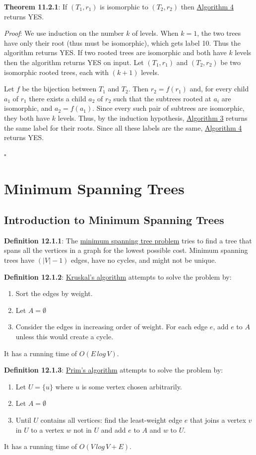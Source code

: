 \documentclass{article}
\newcommand{\separate}[1] {\vspace{#1 pt}\noindent}
\newcommand{\definition}[2]{\textbf{Definition #1}: #2\label{def:#1}}
\newcommand{\proof}[2]{\textit{Proof}: #2 \begin{flushright}\(\square\)\end{flushright}\label{prf:#1}}
\newcommand{\theorem}[3]{\textbf{Theorem #1}: #2 \par\separate{3}\proof{thm:#1}{#3}\label{thm:#1}}
\begin{document}
\noindent\theorem{11.2.1}{If \((T_1,r_1)\) is isomorphic to \((T_2,r_2)\) then \hyperref[alg:Labelled Tree Isomorphism]{Algorithm 4} returns YES.}
{We use induction on the number \(k\) of levels. When \(k=1\), the two trees have only their root (thus must be isomorphic), which gets label 10. Thus the algorithm returns YES. If two rooted trees are isomorphic and both have \(k\) levels then the algorithm returns YES on input. Let \((T_1,r_1)\) and \((T_2,r_2)\) be two isomorphic rooted trees, each with \((k+1)\) levels. 

Let \(f\) be the bijection between \(T_1\) and \(T_2\). Then \(r_2=f(r_1)\) and, for every child \(a_1\) of \(r_1\) there exists a child \(a_2\) of \(r_2\) such that the subtrees rooted at \(a_i\) are isomorphic, and \(a_2 = f(a_1)\). Since every such pair of subtrees are isomorphic, they both have \(k\) levels. Thus, by the induction hypothesis, \hyperref[alg:Label Vertex]{Algorithm 3} returns the same label for their roots. Since all these labels are the same, \hyperref[alg:Labelled Tree Isomorphism]{Algorithm 4} returns YES.}

\section{Minimum Spanning Trees}

\subsection{Introduction to Minimum Spanning Trees}

\definition{12.1.1}{The \underline{minimum spanning tree problem} tries to find a tree that spans all the vertices in a graph for the lowest possible cost. Minimum spanning trees have \((|V|-1)\) edges, have no cycles, and might not be unique.}

\separate{7}\definition{12.1.2}{\underline{Kruskal's algorithm} attempts to solve the problem by:
\begin{enumerate}
    \item Sort the edges by weight.
    \item Let \(A = \emptyset\)
    \item Consider the edges in increasing order of weight. For each edge \(e\), add \(e\) to \(A\) unless this would create a cycle.
\end{enumerate}
It has a running time of \(O(E\,log\,V)\).}

\separate{7}\definition{12.1.3}{\underline{Prim's algorithm} attempts to solve the problem by:
\begin{enumerate}
    \item Let \(U = \{u\}\) where \(u\) is some vertex chosen arbitrarily.
    \item Let \(A = \emptyset\)
    \item Until \(U\) contains all vertices: find the least-weight edge \(e\) that joins a vertex \(v\) in \(U\) to a vertex \(w\) not in \(U\) and add \(e\) to \(A\) and \(w\) to \(U\).
\end{enumerate}
It has a running time of \(O(V\,log\,V + E)\).}
\end{document}
